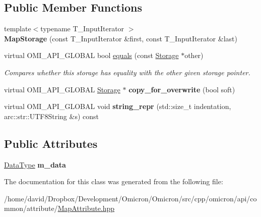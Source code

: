 \subsection*{Public Member Functions}
\begin{DoxyCompactItemize}
\item 
{\footnotesize template$<$typename T\+\_\+\+Input\+Iterator $>$ }\\{\bfseries Map\+Storage} (const T\+\_\+\+Input\+Iterator \&first, const T\+\_\+\+Input\+Iterator \&last)\hypertarget{classomi_1_1_map_attribute_1_1_map_storage_a6b0be9f731a857df18a44345eb8142cf}{}\label{classomi_1_1_map_attribute_1_1_map_storage_a6b0be9f731a857df18a44345eb8142cf}

\item 
virtual O\+M\+I\+\_\+\+A\+P\+I\+\_\+\+G\+L\+O\+B\+AL bool \hyperlink{classomi_1_1_map_attribute_1_1_map_storage_ace7c69c5dcdbecaa137529cd6de221d1}{equals} (const \hyperlink{classomi_1_1_attribute_1_1_storage}{Storage} $\ast$other)\hypertarget{classomi_1_1_map_attribute_1_1_map_storage_ace7c69c5dcdbecaa137529cd6de221d1}{}\label{classomi_1_1_map_attribute_1_1_map_storage_ace7c69c5dcdbecaa137529cd6de221d1}

\begin{DoxyCompactList}\small\item\em Compares whether this storage has equality with the other given storage pointer. \end{DoxyCompactList}\item 
virtual O\+M\+I\+\_\+\+A\+P\+I\+\_\+\+G\+L\+O\+B\+AL \hyperlink{classomi_1_1_attribute_1_1_storage}{Storage} $\ast$ {\bfseries copy\+\_\+for\+\_\+overwrite} (bool soft)\hypertarget{classomi_1_1_map_attribute_1_1_map_storage_ad85c170a81a3b719ff43caf33193e64c}{}\label{classomi_1_1_map_attribute_1_1_map_storage_ad85c170a81a3b719ff43caf33193e64c}

\item 
virtual O\+M\+I\+\_\+\+A\+P\+I\+\_\+\+G\+L\+O\+B\+AL void {\bfseries string\+\_\+repr} (std\+::size\+\_\+t indentation, arc\+::str\+::\+U\+T\+F8\+String \&s) const \hypertarget{classomi_1_1_map_attribute_1_1_map_storage_aaa38c91f875226c3e49c6310910e7531}{}\label{classomi_1_1_map_attribute_1_1_map_storage_aaa38c91f875226c3e49c6310910e7531}

\end{DoxyCompactItemize}
\subsection*{Public Attributes}
\begin{DoxyCompactItemize}
\item 
\hyperlink{classomi_1_1_map_attribute_ac5a11b90e684944a18bcd18376d7eed1}{Data\+Type} {\bfseries m\+\_\+data}\hypertarget{classomi_1_1_map_attribute_1_1_map_storage_acbd10ad38a02c772b4e1dc00656cd145}{}\label{classomi_1_1_map_attribute_1_1_map_storage_acbd10ad38a02c772b4e1dc00656cd145}

\end{DoxyCompactItemize}


The documentation for this class was generated from the following file\+:\begin{DoxyCompactItemize}
\item 
/home/david/\+Dropbox/\+Development/\+Omicron/\+Omicron/src/cpp/omicron/api/common/attribute/\hyperlink{_map_attribute_8hpp}{Map\+Attribute.\+hpp}\end{DoxyCompactItemize}

